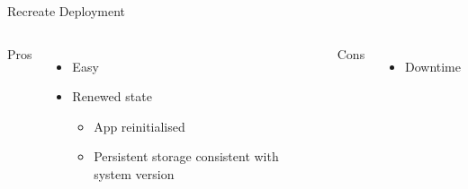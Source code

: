 \documentclass{slide}
\begin{document}
\begin{frame}{Recreate Deployment}
    \vspace{1pt}
    \begin{columns}[t]
      \huge Pros
      {\LARGE
        \begin{itemize}
            \item Easy
            \vspace{2mm}
            \item Renewed state
            \begin{itemize}
                \Large\item App reinitialised
	            \vspace{2mm}
                \Large\item { Persistent storage consistent with system version\\}
            \end{itemize}
        \end{itemize}
      }
      \huge Cons
      {\LARGE
        \begin{itemize}
            \item Downtime
        \end{itemize}
      }
    \end{columns}
\end{frame}
\end{document}
